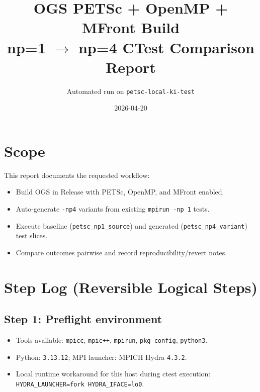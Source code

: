 \documentclass[a4paper,11pt]{article}
\title{OGS PETSc + OpenMP + MFront Build\\
np=1 \texorpdfstring{$\rightarrow$}{->} np=4 CTest Comparison Report}
\author{Automated run on \texttt{petsc-local-ki-test}}
\date{2026-04-20}
\begin{document}
\maketitle

\section*{Scope}
This report documents the requested workflow:
\begin{itemize}
\item Build OGS in Release with PETSc, OpenMP, and MFront enabled.
\item Auto-generate \texttt{-np4} variants from existing \texttt{mpirun -np 1} tests.
\item Execute baseline (\texttt{petsc\_np1\_source}) and generated (\texttt{petsc\_np4\_variant}) test slices.
\item Compare outcomes pairwise and record reproducibility/revert notes.
\end{itemize}

\section*{Step Log (Reversible Logical Steps)}
\subsection*{Step 1: Preflight environment}
\begin{itemize}
\item Tools available: \texttt{mpicc}, \texttt{mpic++}, \texttt{mpirun}, \texttt{pkg-config}, \texttt{python3}.
\item Python: \texttt{3.13.12}; MPI launcher: MPICH Hydra \texttt{4.3.2}.
\item Local runtime workaround for this host during ctest execution:
\texttt{HYDRA\_LAUNCHER=fork HYDRA\_IFACE=lo0}.
\end{itemize}
\end{document}
